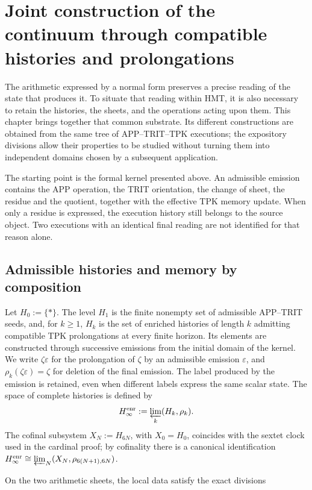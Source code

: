 \section{Joint construction of the continuum through compatible histories and prolongations}
\label{iv:continuo-conjunto}
The arithmetic expressed by a normal form preserves a precise reading of the state that produces it. To situate that reading within HMT, it is also necessary to retain the histories, the sheets, and the operations acting upon them. This chapter brings together that common substrate. Its different constructions are obtained from the same tree of APP–TRIT–TPK executions; the expository divisions allow their properties to be studied without turning them into independent domains chosen by a subsequent application.

The starting point is the formal kernel presented above. An admissible emission contains the APP operation, the TRIT orientation, the change of sheet, the residue and the quotient, together with the effective TPK memory update. When only a residue is expressed, the execution history still belongs to the source object. Two executions with an identical final reading are not identified for that reason alone.



\subsection{Admissible histories and memory by composition}
Let \(H_0:=\{\ast\}\). The level \(H_1\) is the finite nonempty set of
admissible APP--TRIT seeds, and, for \(k\geq1\), \(H_k\) is the set of
enriched histories of length \(k\) admitting compatible TPK prolongations
at every finite horizon. Its elements are constructed through successive emissions
from the initial domain of the kernel. We write \(\zeta\varepsilon\)
for the prolongation of \(\zeta\) by an admissible emission \(\varepsilon\), and
\(\rho_k(\zeta\varepsilon)=\zeta\) for deletion of the final emission. The label
produced by the emission is retained, even when different labels express
the same scalar state. The space of complete histories is defined by
\[
 H_\infty^{\rm enr}:=\varprojlim_k(H_k,\rho_k).
\]
The cofinal subsystem \(X_N:=H_{6N}\), with \(X_0=H_0\), coincides with the
sextet clock used in the cardinal proof; by cofinality there is a canonical
identification
\(H_\infty^{\rm enr}\cong\varprojlim_N(X_N,\rho_{6(N+1),6N})\).

On the two arithmetic sheets, the local data satisfy the exact divisions

